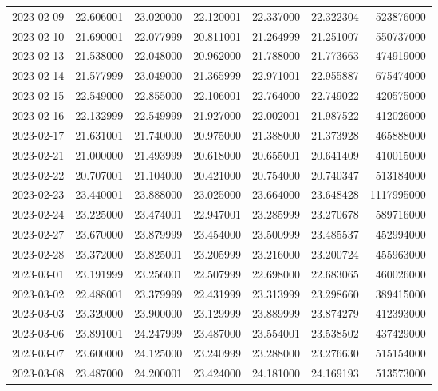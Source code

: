 \begin{tabular}{lrrrrrr}
2023-02-09 &   22.606001 &   23.020000 &   22.120001 &   22.337000 &   22.322304 &   523876000 \\
2023-02-10 &   21.690001 &   22.077999 &   20.811001 &   21.264999 &   21.251007 &   550737000 \\
2023-02-13 &   21.538000 &   22.048000 &   20.962000 &   21.788000 &   21.773663 &   474919000 \\
2023-02-14 &   21.577999 &   23.049000 &   21.365999 &   22.971001 &   22.955887 &   675474000 \\
2023-02-15 &   22.549000 &   22.855000 &   22.106001 &   22.764000 &   22.749022 &   420575000 \\
2023-02-16 &   22.132999 &   22.549999 &   21.927000 &   22.002001 &   21.987522 &   412026000 \\
2023-02-17 &   21.631001 &   21.740000 &   20.975000 &   21.388000 &   21.373928 &   465888000 \\
2023-02-21 &   21.000000 &   21.493999 &   20.618000 &   20.655001 &   20.641409 &   410015000 \\
2023-02-22 &   20.707001 &   21.104000 &   20.421000 &   20.754000 &   20.740347 &   513184000 \\
2023-02-23 &   23.440001 &   23.888000 &   23.025000 &   23.664000 &   23.648428 &  1117995000 \\
2023-02-24 &   23.225000 &   23.474001 &   22.947001 &   23.285999 &   23.270678 &   589716000 \\
2023-02-27 &   23.670000 &   23.879999 &   23.454000 &   23.500999 &   23.485537 &   452994000 \\
2023-02-28 &   23.372000 &   23.825001 &   23.205999 &   23.216000 &   23.200724 &   455963000 \\
2023-03-01 &   23.191999 &   23.256001 &   22.507999 &   22.698000 &   22.683065 &   460026000 \\
2023-03-02 &   22.488001 &   23.379999 &   22.431999 &   23.313999 &   23.298660 &   389415000 \\
2023-03-03 &   23.320000 &   23.900000 &   23.129999 &   23.889999 &   23.874279 &   412393000 \\
2023-03-06 &   23.891001 &   24.247999 &   23.487000 &   23.554001 &   23.538502 &   437429000 \\
2023-03-07 &   23.600000 &   24.125000 &   23.240999 &   23.288000 &   23.276630 &   515154000 \\
2023-03-08 &   23.487000 &   24.200001 &   23.424000 &   24.181000 &   24.169193 &   513573000 \\

\end{tabular}
